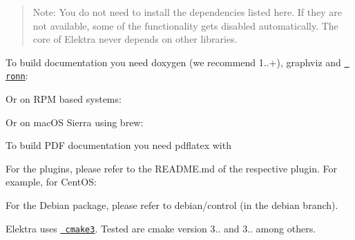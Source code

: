 \begin{quote}
Note\+: You do not need to install the dependencies listed here. If they are not available, some of the functionality gets disabled automatically. The core of Elektra never depends on other libraries. \end{quote}


To build documentation you need doxygen (we recommend 1..+), graphviz and \href{https://github.com/rtomayko/ronn/blob/master/INSTALLING\#files}{\texttt{ ronn}}\+:


\begin{DoxyCode}{0}
\end{DoxyCode}


Or on R\+PM based systems\+:


\begin{DoxyCode}{0}
\end{DoxyCode}


Or on mac\+OS Sierra using brew\+:


\begin{DoxyCode}{0}
\end{DoxyCode}


To build P\+DF documentation you need {\ttfamily pdflatex} with


\begin{DoxyCode}{0}
\end{DoxyCode}


For the plugins, please refer to the R\+E\+A\+D\+M\+E.\+md of the respective plugin. For example, for Cent\+OS\+:


\begin{DoxyCode}{0}
\end{DoxyCode}


For the Debian package, please refer to debian/control (in the debian branch).

Elektra uses \href{https://cmake.org/cmake/help/v3.0/}{\texttt{ cmake3}}. Tested are cmake version 3.. and 3.. among others.

